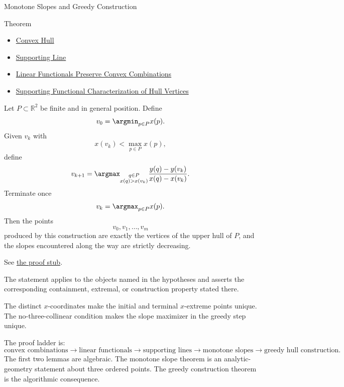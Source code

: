 \begin{topicbox}{Monotone Slopes and Greedy Construction}
\begin{theorembox}{Theorem}
\begin{dependencies}
\begin{itemize}
  \item \hyperref[def:computational-geometry-convex-hull]{Convex Hull}
  \item \hyperref[def:computational-geometry-supporting-line]{Supporting Line}
  \item \hyperref[lem:computational-geometry-linear-functionals-convex-combinations]{Linear Functionals Preserve Convex Combinations}
  \item \hyperref[thm:computational-geometry-supporting-functional-hull-vertices]{Supporting Functional Characterization of Hull Vertices}
\end{itemize}
\end{dependencies}
\begin{theorem}
\label{thm:computational-geometry-greedy-slope-upper-hull}
Let \(P\subset\mathbb{R}^2\) be finite and in general position. Define
\[
  v_0=\argmin_{p\in P}x(p).
\]
Given \(v_k\) with
\[
  x(v_k)<\max_{p\in P}x(p),
\]
define
\[
  v_{k+1}
  =
  \argmax_{\substack{q\in P\\x(q)>x(v_k)}}
  \frac{y(q)-y(v_k)}{x(q)-x(v_k)}.
\]
Terminate once
\[
  v_k=\argmax_{p\in P}x(p).
\]
Then the points
\[
  v_0,v_1,\dots,v_m
\]
produced by this construction are exactly the vertices of the upper hull of
\(P\), and the slopes encountered along the way are strictly decreasing.
\end{theorem}
\end{theorembox}

\begin{remark*}[Proof]
See
\hyperref[prf:computational-geometry-greedy-slope-upper-hull]{the proof stub}.
\end{remark*}

\begin{remark*}
The statement applies to the objects named in the hypotheses and asserts the
corresponding containment, extremal, or construction property stated there.
\end{remark*}

\begin{remark*}
The distinct \(x\)-coordinates make the initial and terminal \(x\)-extreme
points unique. The no-three-collinear condition makes the slope maximizer in
the greedy step unique.
\end{remark*}

\begin{remark*}
The proof ladder is:
\[
\text{convex combinations}
\to
\text{linear functionals}
\to
\text{supporting lines}
\to
\text{monotone slopes}
\to
\text{greedy hull construction}.
\]
The first two lemmas are algebraic. The monotone slope theorem is an
analytic-geometry statement about three ordered points. The greedy construction
theorem is the algorithmic consequence.
\end{remark*}


\end{topicbox}
